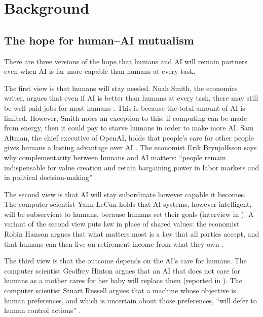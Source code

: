 \documentclass[article, 11pt, reqno]{amsart}
\theoremstyle{named}
\theoremstyle{plain}
\begin{document}
\section{Background}\label{sec:background}

\subsection{The hope for human--AI mutualism}\label{sec:hope}

There are three versions of the hope that humans and AI will remain partners even when AI is far more capable than humans at every task.

The first view is that humans will stay needed. Noah Smith, the economics writer, argues that even if AI is better than humans at every task, there may still be well-paid jobs for most humans \citep{Smith2024}. This is because the total amount of AI is limited. However, Smith notes an exception to this: if computing can be made from energy, then it could pay to starve humans in order to make more AI. Sam Altman, the chief executive of OpenAI, holds that people's care for other people gives humans a lasting advantage over AI \citep{Altman2025}. The economist Erik Brynjolfsson says why complementarity between humans and AI matters: ``people remain indispensable for value creation and retain bargaining power in labor markets and in political decision-making'' \citep[273]{Brynjolfsson2022}.

The second view is that AI will stay subordinate however capable it becomes. The computer scientist Yann LeCun holds that AI systems, however intelligent, will be subservient to humans, because humans set their goals (interview in \citealp{Perrigo2024}). A variant of the second view puts law in place of shared values: the economist Robin Hanson argues that what matters most is a law that all parties accept, and that humans can then live on retirement income from what they own \citep{Hanson2009}.

The third view is that the outcome depends on the AI's care for humans. The computer scientist Geoffrey Hinton argues that an AI that does not care for humans as a mother cares for her baby will replace them (reported in \citealp{Egan2025}). The computer scientist Stuart Russell argues that a machine whose objective is human preferences, and which is uncertain about those preferences, ``will defer to human control actions'' \citep[52]{Russell2022}.
\end{document}
